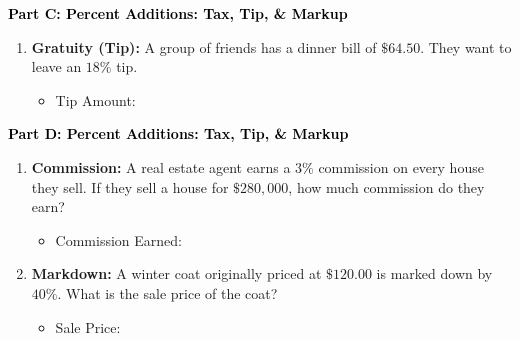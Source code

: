 \documentclass[12pt, letterpaper, fleqn]{article}
\newcommand{\blank}{\underline{\hspace{2.2cm}}}
\begin{document}
\newpage

\begin{tcolorbox}[colback=customteal!20]
\large\textcolor{black}{\textbf{Part C: Percent Additions: Tax, Tip, \& Markup}}
\end{tcolorbox}

\vspace{3mm}

\begin{enumerate}[itemsep=2.2cm, leftmargin=0.6cm, resume]
\begin{itemize}
\item Total Cost: \blank
\end{itemize}
\item \textbf{Gratuity (Tip):} A group of friends has a dinner bill of $\$64.50$. They want to leave an $18\%$ tip. 
\vspace{1.5cm}
\begin{itemize}
\item Tip Amount: \blank
\end{itemize}
\end{enumerate}

\newpage

\begin{tcolorbox}[colback=customteal!20]
\large\textcolor{black}{\textbf{Part D: Percent Additions: Tax, Tip, \& Markup}}
\end{tcolorbox}

\vspace{3mm}

\begin{enumerate}[itemsep=2.2cm, leftmargin=0.6cm, resume]
\begin{itemize}
\item Total Cost: \blank
\end{itemize}
\item \textbf{Commission:} A real estate agent earns a $3\%$ commission on every house they sell. If they sell a house for $\$280,000$, how much commission do they earn?
\vspace{1.5cm}
\begin{itemize}
\item Commission Earned: \blank
\end{itemize}
\item \textbf{Markdown:} A winter coat originally priced at $\$120.00$ is marked down by $40\%$. What is the sale price of the coat?
\vspace{1.5cm}
\begin{itemize}
\item Sale Price: \blank
\end{itemize}
\end{enumerate}
\end{document}
